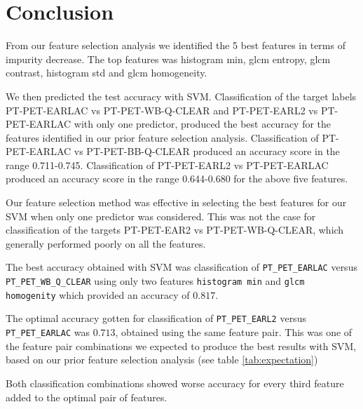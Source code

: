 \section{Conclusion}

From our feature selection analysis we identified the 5 best features in terms
of impurity decrease. The top features was histogram min, glcm entropy, glcm
contrast, histogram std and glcm homogeneity. 

We then predicted the test accuracy with SVM. Classification of the target
labels PT-PET-EARLAC vs PT-PET-WB-Q-CLEAR and PT-PET-EARL2 vs PT-PET-EARLAC
with only one predictor, produced the best accuracy for the features identified
in our prior feature selection analysis. 
Classification of PT-PET-EARLAC vs PT-PET-BB-Q-CLEAR produced an accuracy score
in the range 0.711-0.745. 
Classification of PT-PET-EARL2 vs PT-PET-EARLAC produced an accuracy score in
the range 0.644-0.680 for the above five features. 

Our feature selection method was
effective in selecting the best features for our SVM when only one predictor
was considered. 
This was not the case for classification of the targets PT-PET-EAR2 vs
PT-PET-WB-Q-CLEAR, which generally performed poorly on all the features. 





The best accuracy obtained with SVM was classification of \verb|PT_PET_EARLAC| versus \verb|PT_PET_WB_Q_CLEAR|
using only two features \verb|histogram min| and \verb|glcm homogenity| which provided 
an accuracy of $0.817$. 


The optimal accuracy gotten for classification of  \verb|PT_PET_EARL2| versus
\verb|PT_PET_EARLAC| was $0.713$, obtained using the same feature pair. 
This was one of the feature pair combinations we expected to produce the best
results with SVM, based on our prior feature selection analysis (see table \ref{tab:expectation})

Both classification combinations showed worse accuracy for every 
third feature added to the optimal pair of features. 


